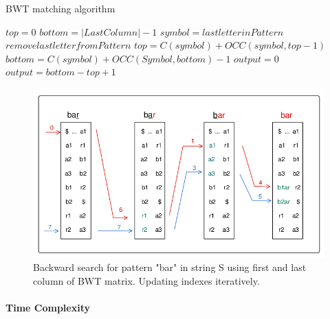 \documentclass[11pt,a4paper]{report}
\begin{document}
\begin{algorithm}[H]
   \caption{BWT matching algorithm}
    \begin{algorithmic}[1]
       	\State ${top} = 0$
        \State ${bottom} = \lvert LastColumn \rvert -1$
            	\State $symbol = last letter in Pattern$
            	\State $remove last letter from Pattern$
        				\State $top = C(symbol)+ OCC(symbol,top-1)$
        				\State $bottom = C(symbol)+ OCC(Symbol,bottom)-1$
        			\Else
        				\State $output = 0 $
        			\EndIf
       		\Else 
       			\State $output = bottom-top+1 $ 
       \EndIf
     
     \EndWhile 
    \EndFunction

	\end{algorithmic}
\end{algorithm}




\begin{figure}[H]
\centering
\includegraphics[width=12cm]{pictures/bar_1.png}
\caption{Backward search for pattern "bar" in string S using first and last column of BWT matrix. Updating indexes iteratively.}
\label{backwardSearch}
\end{figure}



\paragraph{Time Complexity}
\end{document}
